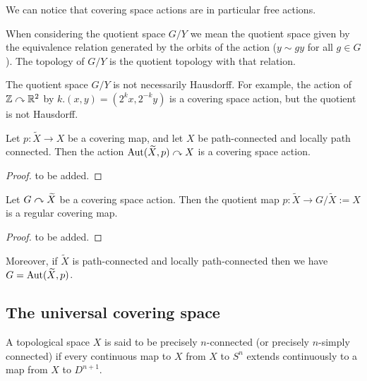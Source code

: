 \documentclass[11pt,a4paper]{article}
\begin{document}
\begin{remark}
  We can notice that covering space actions are in particular free actions.
\end{remark}

\begin{remark}
  When considering the quotient space $G / Y$
  we mean the quotient space given by the equivalence
  relation generated by the orbits of the action
  ($y \sim gy$ for all $g \in G$).
  The topology of $G / Y$ is the quotient topology with that relation.
\end{remark}

\begin{remark}
  The quotient space $G / Y$ is not necessarily Hausdorff.
  For example, the action of $\mathbb{Z} \curvearrowright \mathbb{R}^2$ by
  $k.(x,y) = (2^k x, 2^{-k} y)$ is a covering space action,
  but the quotient is not Hausdorff.
\end{remark}

\begin{proposition}
  Let $p \colon \widetilde X \to X$ be a covering map,
  and let $X$ be path-connected and locally path connected.
  Then the action $\operatorname{Aut}(\widetilde X, p) \curvearrowright X$ is a covering space action.
\end{proposition}
\begin{proof}
  to be added.
\end{proof}

\begin{theorem}
  Let $G \curvearrowright \widetilde X$ be a covering space action.
  Then the quotient map $p \colon \widetilde X \to G / \widetilde X := X$
  is a regular covering map. %
\end{theorem}
\begin{proof}
  to be added.
\end{proof}

\begin{remark}
  Moreover, if $\widetilde X$ is path-connected and locally path-connected then
  we have $G = \operatorname{Aut}(\widetilde X, p)$.
\end{remark}

\subsection{The universal covering space}
\begin{definition}
  A topological space $X$ is said to be precisely $n$-connected
  (or precisely $n$-simply connected) if every continuous map to $X$
  from $X$ to $S^n$ extends continuously to a map from $X$ to $D^{n+1}$.
\end{definition}
\end{document}
